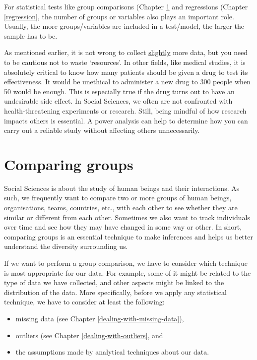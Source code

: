 \documentclass[
]{book}
\begin{document}
For statistical tests like group comparisons (Chapter \ref{comparing-groups} and regressions (Chapter \ref{regression}, the number of groups or variables also plays an important role. Usually, the more groups/variables are included in a test/model, the larger the sample has to be.

As mentioned earlier, it is not wrong to collect \underline{slightly} more data, but you need to be cautious not to waste `resources'. In other fields, like medical studies, it is absolutely critical to know how many patients should be given a drug to test its effectiveness. It would be unethical to administer a new drug to 300 people when 50 would be enough. This is especially true if the drug turns out to have an undesirable side effect. In Social Sciences, we often are not confronted with health-threatening experiments or research. Still, being mindful of how research impacts others is essential. A power analysis can help to determine how you can carry out a reliable study without affecting others unnecessarily.

\hypertarget{comparing-groups}{%
\chapter{Comparing groups}\label{comparing-groups}}

Social Sciences is about the study of human beings and their interactions. As such, we frequently want to compare two or more groups of human beings, organisations, teams, countries, etc., with each other to see whether they are similar or different from each other. Sometimes we also want to track individuals over time and see how they may have changed in some way or other. In short, comparing groups is an essential technique to make inferences and helps us better understand the diversity surrounding us.

If we want to perform a group comparison, we have to consider which technique is most appropriate for our data. For example, some of it might be related to the type of data we have collected, and other aspects might be linked to the distribution of the data. More specifically, before we apply any statistical technique, we have to consider at least the following:

\begin{itemize}
\item
  missing data (see Chapter \ref{dealing-with-missing-data}),
\item
  outliers (see Chapter \ref{dealing-with-outliers}, and
\item
  the assumptions made by analytical techniques about our data.
\end{itemize}
\end{document}
